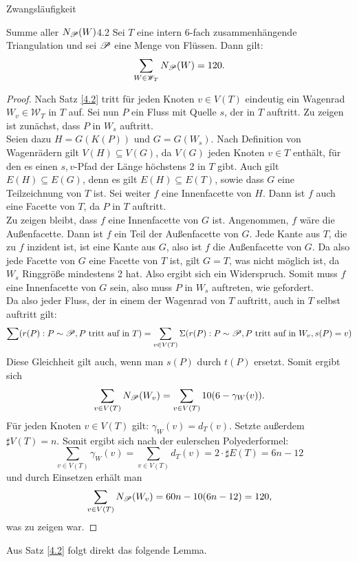 \begin{section}{Zwangsläufigkeit}
 \begin{satzl}{Summe aller $N_{\mathscr{P}}(W)$}{4.2}
  Sei $T$ eine intern 6-fach zusammenhängende Triangulation und sei $\mathscr{P}$ eine Menge von Flüssen. Dann gilt:
  \[\sum_{W\in \mathscr{W}_T} N_{\mathscr{P}}(W) = 120\text{.}\]
 \end{satzl}
 \begin{proof}
  Nach Satz \ref{4.2} tritt für jeden Knoten $v \in V(T)$ eindeutig ein Wagenrad $W_v \in \mathscr{W}_T$ in $T$ auf. Sei nun $P$ ein Fluss mit Quelle $s$, der in $T$ auftritt. Zu zeigen ist zunächst, dass $P$ in $W_s$ auftritt.\\
  Seien dazu $H=G(K(P))$ und $G=G(W_s)$. Nach Definition von Wagenrädern gilt $V(H) \subseteq V(G)$, da $V(G)$ jeden Knoten $v \in T$ enthält, für den es einen $s,v$-Pfad   der Länge höchstens 2 in $T$ gibt. Auch gilt $E(H) \subseteq E(G)$, denn es gilt $E(H) \subseteq E(T)$, sowie dass $G$ eine Teilzeichnung von $T$ ist. Sei weiter $f$ eine Innenfacette von $H$. Dann ist $f$ auch eine Facette von $T$, da $P$ in $T$ auftritt.\\
  Zu zeigen bleibt, dass $f$ eine Innenfacette von $G$ ist. Angenommen, $f$ wäre die Außenfacette. Dann ist $f$ ein Teil der Außenfacette von $G$. Jede Kante aus $T$, die zu $f$ inzident ist, ist eine Kante aus $G$, also ist $f$ die Außenfacette von $G$. Da also jede Facette von $G$ eine Facette von $T$ ist, gilt $G=T$, was nicht möglich ist, da $W_s$ Ringgröße mindestens 2 hat. Also ergibt sich ein Widerspruch. Somit muss $f$ eine Innenfacette von $G$ sein, also muss $P$ in $W_s$ auftreten, wie gefordert.\\
  Da also jeder Fluss, der in einem der Wagenrad von $T$ auftritt, auch in $T$ selbst auftritt gilt:
  \[\sum (r(P):P\sim \mathscr{P}, P \text{ tritt auf in } T) = \sum_{v\in V(T)} \Sigma (r(P):P\sim \mathscr{P}, P \text{ tritt auf in } W_v,s(P)=v)\]
  Diese Gleichheit gilt auch, wenn man $s(P)$ durch $t(P)$ ersetzt. Somit ergibt sich
  \[\sum_{v\in V(T)} N_{\mathscr{P}}(W_v) = \sum_{v\in V(T)} 10(6-\gamma_W(v))\text{.}\]
  Für jeden Knoten $v \in V(T)$ gilt: $\gamma_W(v) = d_T(v)$. Setzte außerdem $\sharp V(T) = n$. Somit ergibt sich nach der eulerschen Polyederformel:
  \[\sum_{v\in V(T)} \gamma_W(v) = \sum_{v\in V(T)} d_T(v) = 2\cdot \sharp E(T) = 6n -12\]
  und durch Einsetzen erhält man
  \[\sum_{v\in V(T)} N_{\mathscr{P}}(W_v) = 60n - 10(6n - 12) = 120\text{,}\]
  was zu zeigen war.
 \end{proof}

 Aus Satz \ref{4.2} folgt direkt das folgende Lemma.
 

\end{section}
